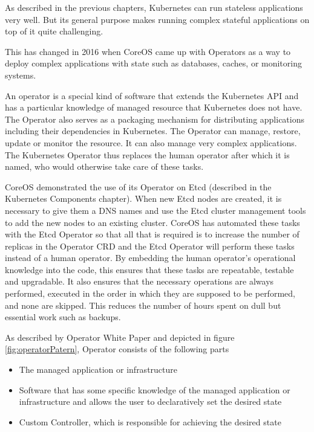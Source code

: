 \pagebreak
{}
As described in the previous chapters, Kubernetes can run stateless applications very well. But its general purpose makes running complex stateful applications on top of it quite challenging.


This has changed in 2016 when CoreOS came up with Operators as a way to deploy complex applications with state such as databases, caches, or monitoring systems. \cite{IArchiveCOSOperators}

An operator is a special kind of software that extends the Kubernetes API and has a particular knowledge of managed resource that Kubernetes does not have. The Operator also serves as a packaging mechanism for distributing applications including their dependencies in Kubernetes. The Operator can manage, restore, update or monitor the resource. It can also manage very complex applications. The Kubernetes Operator thus replaces the human operator after which it is named, who would otherwise take care of these tasks. \cite{OperatorsPreface} \cite{IArchiveCOSOperators}


CoreOS demonstrated the use of its Operator on Etcd (described in the Kubernetes Components chapter). When new Etcd nodes are created, it is necessary to give them a DNS names and use the Etcd cluster management tools to add the new nodes to an existing cluster. CoreOS has automated these tasks with the Etcd Operator so that all that is required is to increase the number of replicas in the Operator CRD and the Etcd Operator will perform these tasks instead of a human operator. \cite{IArchiveCOSOperators}
By embedding the human operator's operational knowledge into the code, this ensures that these tasks are repeatable, testable and upgradable. It also ensures that the necessary operations are always performed, executed in the order in which they are supposed to be performed, and none are skipped. This reduces the number of hours spent on dull but essential work such as backups. \cite{OperatorWhitepaper}

As described by Operator White Paper \cite{OperatorWhitepaper} and depicted in figure \ref{fig:operatorPatern}, Operator consists of the following parts
\begin{itemize}
  \item The managed application or infrastructure
  \item Software that has some specific knowledge of the managed application or infrastructure and allows the user to declaratively set the desired state
  \item Custom Controller, which is responsible for achieving the desired state
\end{itemize}

